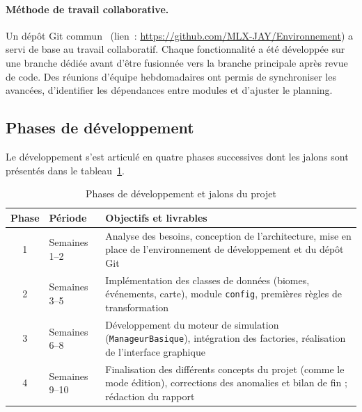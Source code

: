 \paragraph{Méthode de travail collaborative.}
Un dépôt Git commun~\cite{chacon2014pro} (lien~: \url{https://github.com/MLX-JAY/Environnement}) a servi de base au travail collaboratif.
Chaque fonctionnalité a été développée sur une branche dédiée avant d'être
fusionnée vers la branche principale après revue de code. Des réunions d'équipe
hebdomadaires ont permis de synchroniser les avancées, d'identifier les dépendances
entre modules et d'ajuster le planning.

\subsection{Phases de développement}
\label{subsec:phases}

Le développement s'est articulé en quatre phases successives dont les jalons sont
présentés dans le tableau~\ref{tab:planning}.

\begin{table}[htbp]
  \centering
  \caption{Phases de développement et jalons du projet}
  \label{tab:planning}
  \begin{tabular}{cl>{\raggedright\arraybackslash}p{8cm}}
    \toprule
    \textbf{Phase} & \textbf{Période} & \textbf{Objectifs et livrables} \\
    \midrule
    1 & Semaines 1--2  & Analyse des besoins, conception de l'architecture,
                         mise en place de l'environnement de développement
                         et du dépôt Git \\[0.4em]
    2 & Semaines 3--5  & Implémentation des classes de données (biomes,
                         événements, carte), module \texttt{config},
                         premières règles de transformation \\[0.4em]
    3 & Semaines 6--8  & Développement du moteur de simulation
                         (\texttt{ManageurBasique}), intégration des factories,
                         réalisation de l'interface graphique \\[0.4em]
    4 & Semaines 9--10 & Finalisation des différents concepts du projet
                         (comme le mode édition), corrections des anomalies
                         et bilan de fin ; rédaction du rapport \\
    \bottomrule
  \end{tabular}
\end{table}

